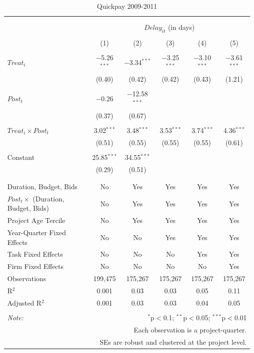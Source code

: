 \documentclass[]{article}
\begin{document}
\begin{table}[H] \centering 
  \caption{Quickpay 2009-2011} 
  \label{} 
\small 
\begin{tabular}{@{\extracolsep{-2pt}}lccccc} 
\\[-1.8ex]\hline 
\hline \\[-1.8ex] 
\\[-1.8ex] & \multicolumn{5}{c}{$Delay_{it}$ (in days)} \\ 
\\[-1.8ex] & (1) & (2) & (3) & (4) & (5)\\ 
\hline \\[-1.8ex] 
 $Treat_i$ & $-$5.26$^{***}$ & $-$3.34$^{***}$ & $-$3.25$^{***}$ & $-$3.10$^{***}$ & $-$3.61$^{***}$ \\ 
  & (0.40) & (0.42) & (0.42) & (0.43) & (1.21) \\ 
  & & & & & \\ 
 $Post_t$ & $-$0.26 & $-$12.58$^{***}$ &  &  &  \\ 
  & (0.37) & (0.67) &  &  &  \\ 
  & & & & & \\ 
 $Treat_i \times Post_t$ & 3.02$^{***}$ & 3.48$^{***}$ & 3.53$^{***}$ & 3.74$^{***}$ & 4.36$^{***}$ \\ 
  & (0.51) & (0.55) & (0.55) & (0.55) & (0.61) \\ 
  & & & & & \\ 
 Constant & 25.85$^{***}$ & 34.55$^{***}$ &  &  &  \\ 
  & (0.29) & (0.51) &  &  &  \\ 
  & & & & & \\ 
\hline \\[-1.8ex] 
Duration, Budget, Bids & No & Yes & Yes & Yes & Yes \\ 
$Post_t \times$  (Duration, Budget, Bids) & No & Yes & Yes & Yes & Yes \\ 
Project Age Tercile & No & Yes & Yes & Yes & Yes \\ 
Year-Quarter Fixed Effects & No & No & Yes & Yes & Yes \\ 
Task Fixed Effects & No & No & No & Yes & Yes \\ 
Firm Fixed Effects & No & No & No & No & Yes \\ 
Observations & 199,475 & 175,267 & 175,267 & 175,267 & 175,267 \\ 
R$^{2}$ & 0.001 & 0.03 & 0.03 & 0.05 & 0.11 \\ 
Adjusted R$^{2}$ & 0.001 & 0.03 & 0.03 & 0.04 & 0.05 \\ 
\hline 
\hline \\[-1.8ex] 
\textit{Note:}  & \multicolumn{5}{r}{$^{*}$p$<$0.1; $^{**}$p$<$0.05; $^{***}$p$<$0.01} \\ 
 & \multicolumn{5}{r}{Each observation is a project-quarter.} \\ 
 & \multicolumn{5}{r}{SEs are robust and clustered at the project level.} \\ 
\end{tabular} 
\end{table}
\end{document}
